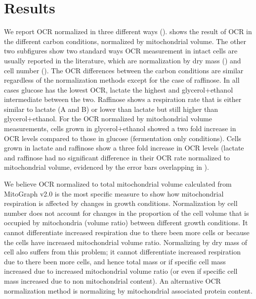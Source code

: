 \section{Results}
We report OCR normalized in three different ways ().  shows the result of OCR in the different carbon conditions, normalized by mitochondrial volume. The other two subfigures show two standard ways OCR measurement in intact cells are usually reported in the literature, which are normalization by dry mass () and cell number (). The OCR differences between the carbon conditions are similar regardless of the normalization methods except for the case of raffinose. In all cases glucose has the lowest OCR, lactate the highest and glycerol+ethanol intermediate between the two. Raffinose shows a respiration rate that is either similar to lactate (A and B) or lower than lactate but still higher than glycerol+ethanol. For the OCR normalized by mitochondrial volume measurements, cells grown in glycerol+ethanol showed a two fold increase in OCR levels compared to those in glucose (fermentation only conditions). Cells grown in lactate and raffinose show a three fold increase in OCR levels (lactate and raffinose had no significant difference in their OCR rate normalized to mitochondrial volume, evidenced by the error bars overlapping in ).

We believe OCR normalized to total mitochondrial volume calculated from MitoGraph v2.0 is the most specific measure to show how mitochondrial respiration is affected by changes in growth conditions. Normalization by cell number does not account for changes in the proportion of the cell volume that is occupied by mitochondria (volume ratio) between different growth conditions. It cannot differentiate increased respiration due to there been more cells or because the cells have increased mitochondrial volume ratio. Normalizing by dry mass of cell also suffers from this problem; it cannot differentiate increased respiration due to there been more cells, and hence total mass or if specific cell mass increased due to increased mitochondrial volume ratio (or even if specific cell mass increased due to non mitochondrial content). An alternative OCR normalization method is normalizing by mitochondrial associated protein content.

